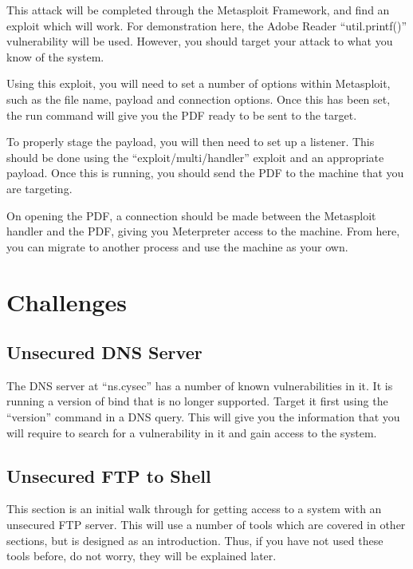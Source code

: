 			This attack will be completed through the Metasploit Framework, and find an exploit which will work.
			For demonstration here, the Adobe Reader ``util.printf()'' vulnerability will be used.
			However, you should target your attack to what you know of the system.

			Using this exploit, you will need to set a number of options within Metasploit, such as the file name, payload and connection options.
			Once this has been set, the run command will give you the PDF ready to be sent to the target.

			To properly stage the payload, you will then need to set up a listener.
			This should be done using the ``exploit/multi/handler'' exploit and an appropriate payload.
			Once this is running, you should send the PDF to the machine that you are targeting.

			On opening the PDF, a connection should be made between the Metasploit handler and the PDF, giving you Meterpreter access to the machine.
			From here, you can migrate to another process and use the machine as your own.
	\section{Challenges}
	\subsection{Unsecured DNS Server}
		The DNS server at ``ns.cysec'' has a number of known vulnerabilities in it.
		It is running a version of bind that is no longer supported.
		Target it first using the ``version'' command in a DNS query.
		This will give you the information that you will require to search for a vulnerability in it and gain access to the system.

		\subsection{Unsecured FTP to Shell}
			This section is an initial walk through for getting access to a system with an unsecured FTP server.
			This will use a number of tools which are covered in other sections, but is designed as an introduction.
			Thus, if you have not used these tools before, do not worry, they will be explained later.

